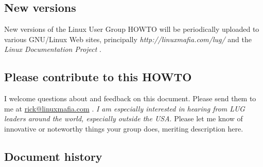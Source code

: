 \documentclass{HOWTO}
\begin{document}
\subsection{New versions}

New versions of the Linux User Group HOWTO will be periodically
uploaded to various GNU/Linux Web sites, principally 
\emph{http://linuxmafia.com/lug/} \texttt{\aevurl}
 and
the 
\emph{Linux Documentation Project} \texttt{\aewurl}
.




\subsection{Please contribute to this HOWTO }

 
I welcome questions about and feedback on this document. Please send
them to me at \ifpdf
\href{mailto:rick@linuxmafia.com}{rick@linuxmafia.com}%
\else
{}%
\fi{}
. {\itshape I am especially interested in
hearing from LUG leaders around the world, especially outside the USA\/}. 
Please let me know of innovative or noteworthy things your group does,
meriting description here.




\subsection{Document history}
\end{document}

